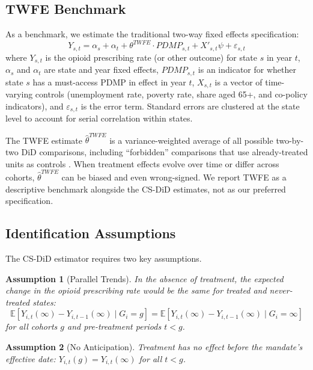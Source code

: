 \documentclass[12pt]{article}
\newcommand{\E}{\mathbb{E}}
\newtheorem{assumption}{Assumption}
\begin{document}
\subsection{TWFE Benchmark}\label{sec:empirical_twfe}

As a benchmark, we estimate the traditional two-way fixed effects specification:
\begin{equation}\label{eq:twfe}
Y_{s,t} = \alpha_s + \alpha_t + \theta^{TWFE} \cdot PDMP_{s,t} + X'_{s,t}\psi + \varepsilon_{s,t}
\end{equation}
where $Y_{s,t}$ is the opioid prescribing rate (or other outcome) for state $s$ in year $t$, $\alpha_s$ and $\alpha_t$ are state and year fixed effects, $PDMP_{s,t}$ is an indicator for whether state $s$ has a must-access PDMP in effect in year $t$, $X_{s,t}$ is a vector of time-varying controls (unemployment rate, poverty rate, share aged 65+, and co-policy indicators), and $\varepsilon_{s,t}$ is the error term. Standard errors are clustered at the state level to account for serial correlation within states.

The TWFE estimate $\hat{\theta}^{TWFE}$ is a variance-weighted average of all possible two-by-two DiD comparisons, including ``forbidden'' comparisons that use already-treated units as controls \citep{goodmanbacon2021difference}. When treatment effects evolve over time or differ across cohorts, $\hat{\theta}^{TWFE}$ can be biased and even wrong-signed. We report TWFE as a descriptive benchmark alongside the CS-DiD estimates, not as our preferred specification.

\subsection{Identification Assumptions}\label{sec:empirical_identification}

The CS-DiD estimator requires two key assumptions.

\begin{assumption}[Parallel Trends]\label{as:pt}
In the absence of treatment, the expected change in the opioid prescribing rate would be the same for treated and never-treated states:
\begin{equation}
\E[Y_{i,t}(\infty) - Y_{i,t-1}(\infty) \mid G_i = g] = \E[Y_{i,t}(\infty) - Y_{i,t-1}(\infty) \mid G_i = \infty]
\end{equation}
for all cohorts $g$ and pre-treatment periods $t < g$.
\end{assumption}

\begin{assumption}[No Anticipation]\label{as:noantic}
Treatment has no effect before the mandate's effective date: $Y_{i,t}(g) = Y_{i,t}(\infty)$ for all $t < g$.
\end{assumption}
\end{document}
